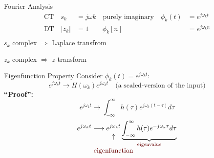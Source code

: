 \begin{frame}{Fourier Analysis}
\begin{align*}
  \text{CT}\quad s_k &= j\omega k\quad \text{purely imaginary} \quad \phi_k(t) &= e^{j\omega_k t}\\
  \text{DT}\quad |z_k| &= 1\quad \text{} \quad \phi_k[n] &= e^{j\omega_k n}\\
\end{align*}
$s_k$ complex $\Rightarrow$  Laplace transfrom\par
$z_k$ complex $\Rightarrow$ $z$-transform

\end{frame}

\begin{frame}{Eigenfunction Property}
    Consider $\phi_k(t) = e^{j\omega_k t}$:
    \begin{equation*}
        e^{j\omega_k t} \longrightarrow H(\omega_k) e^{j\omega_k t} \quad \text{(a scaled-version of the input)}
    \end{equation*}
    \textbf{``Proof'':}\pause
    {
        \begin{equation*}
            e^{j\omega_k t} \longrightarrow \int_{-\infty}^{\infty}h(\tau)e^{j\omega_k (t-\tau)}d\tau
        \end{equation*}
        \pause
        \begin{equation*}
            e^{j\omega_k t} \longrightarrow
            \underset{\mathclap{\tikz \node {$\uparrow$} node [below=3ex, text=red!40!black] {eigenfunction};}}{
            e^{j\omega_k t}
            }
            \underbrace{
            \int_{-\infty}^{\infty} h(\tau)e^{-j\omega_k \tau}d\tau
            }_{\textcolor{red!40!black}{\text{eigenvalue}}}
        \end{equation*}
    }
\end{frame}


